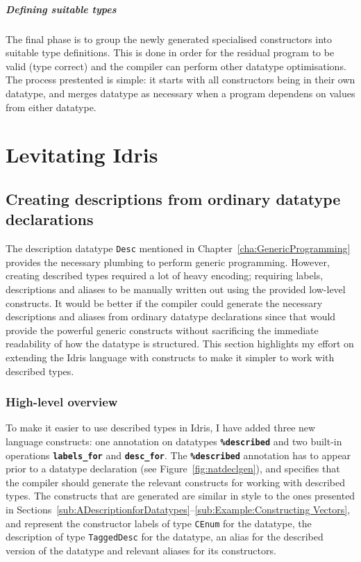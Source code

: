 \documentclass{ituthesis}
\newcommand{\tttype}[1]{\textcolor{type-color}{\texttt{#1}}}
\newcommand{\ttdec}[1]{\textcolor{declared-var-color}{\texttt{#1}}}
\theoremstyle{break}
\begin{document}
\paragraph{Defining suitable types}
\label{par:Defining suitable types}
The final phase is to group the newly generated specialised constructors into suitable type definitions.
This is done in order for the residual program to be valid (type correct) and the compiler can perform other datatype optimisations.
The process prestented is simple: it starts with all constructors being in their own datatype, and merges datatype as necessary when a program dependens on values from either datatype.

\chapter{Levitating Idris}
\label{cha:LevitatingIdris}

\section{Creating descriptions from ordinary datatype declarations}
\label{sec:Creating descriptions from ordinary data declarations}
The description datatype \tttype{Desc} mentioned in Chapter~\ref{cha:GenericProgramming} provides the necessary plumbing to perform generic programming.
However, creating described types required a lot of heavy encoding; requiring labels, descriptions and aliases to be manually written out using the provided low-level constructs.
It would be better if the compiler could generate the necessary descriptions and aliases from ordinary datatype declarations since that would provide the powerful generic constructs without sacrificing the immediate readability of how the datatype is structured.
This section highlights my effort on extending the Idris language with constructs to make it simpler to work with described types.

\subsection{High-level overview}
\label{sub:High-level overview}
To make it easier to use described types in Idris, I have added three new language constructs: one annotation on datatypes \texttt{\textbf{\%described}} and two built-in operations \texttt{\textbf{labels\_for}} and \texttt{\textbf{desc\_for}}.
The \texttt{\textbf{\%described}} annotation has to appear prior to a datatype declaration (see Figure~\ref{fig:natdeclgen}), and specifies that the compiler should generate the relevant constructs for working with described types.
The constructs that are generated are similar in style to the ones presented in Sections~\ref{sub:ADescriptionforDatatypes}--\ref{sub:Example:Constructing Vectors}, and represent the constructor labels of type \tttype{CEnum} for the datatype, the description of type \ttdec{TaggedDesc} for the datatype, an alias for the described version of the datatype and relevant aliases for its constructors.
\end{document}
